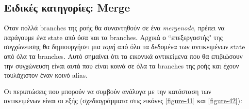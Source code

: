 
\subsection{Ειδικές κατηγορίες: Merge}

Όταν πολλά branches της ροής θα συναντηθούν σε ένα \textit{mergenode}, πρέπει να
παράγουμε ένα state από όσα και τα branches. Αρχικά ο ``επεξεργαστής" της
συγχώνευσης θα δημιουργήσει μια \textit{τομή} από όλα τα δεδομένα των
αντικειμένων state από όλα τα branches. Αυτό σημαίνει ότι τα εικονικά
αντικείμενα που θα επιβιώσουν την συγχώνευση είναι αυτά που είναι κοινά σε όλα
τα branches της ροής και έχουν τουλάχιστον έναν κοινό alias.

Οι περιπτώσεις που μπορούν να συμβούν ανάλογα με την κατάσταση των αντικειμένων
είναι οι εξής (σχεδιαγράμματα στις εικόνες \ref{figure-41} και \ref{figure-42}):

